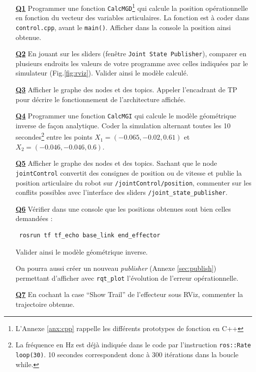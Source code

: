 \documentclass[12pt,a4paper]{article}
\begin{document}
\begin{itemize}
 \medskip\item[\textbf{\underline{Q1}}] Programmer une fonction \texttt{CalcMGD}\footnote{ L'Annexe \ref{anx:cpp} rappelle les différents prototypes de fonction en C++} qui calcule la position opérationnelle en fonction du vecteur des variables articulaires. La fonction est à coder dans \texttt{control.cpp}, avant le \texttt{main()}.
 Afficher dans la console la position ainsi obtenue.


  \medskip\item[\textbf{\underline{Q2}}] En jouant sur les sliders (fenêtre \texttt{Joint State Publisher}), comparer en plusieurs endroits les valeurs de votre programme avec celles indiquées par le simulateur (Fig.\ref{fig:rviz}).
 Valider ainsi le modèle calculé.
 
 \medskip\item[\textbf{\underline{Q3}}] Afficher le graphe des nodes et des topics. Appeler l'encadrant de TP pour décrire le fonctionnement de l'architecture affichée. 
 
 \medskip\item[\textbf{\underline{Q4}}] Programmer une fonction \texttt{CalcMGI} qui calcule le modèle géométrique inverse de façon analytique. 
 Coder la simulation alternant toutes les 10 secondes\footnote{La fréquence en Hz est déjà indiquée dans le code par l'instruction \texttt{ros::Rate loop(30)}. 10 secondes correspondent donc à 300 itérations dans la boucle while.} entre les points $X_1=(-0.065,-0.02,0.61)$ et $X_2=(-0.046, -0.046, 0.6)$.
 

  \medskip\item[\textbf{\underline{Q5}}] Afficher le graphe des nodes et des topics. Sachant que le node \texttt{jointControl} convertit des consignes de position ou de vitesse et publie la position articulaire du robot sur \texttt{/jointControl/position}, commenter sur les conflits possibles avec l'interface des sliders \texttt{/joint\_state\_publisher}.
 
 \medskip\item[\textbf{\underline{Q6}}]  Vérifier dans une console que les positions obtenues sont bien celles demandées :
 \begin{verbatim}
 rosrun tf tf_echo base_link end_effector
\end{verbatim}Valider ainsi le modèle géométrique inverse. 

On pourra aussi créer un nouveau \emph{publisher} (Annexe \ref{sec:publish}) permettant d'afficher avec \texttt{rqt\_plot} l'évolution de l'erreur opérationnelle.

\medskip\item[\textbf{\underline{Q7}}] En cochant la case ``Show Trail'' de l'effecteur sous RViz, commenter la trajectoire obtenue.

\end{itemize}
\end{document}
